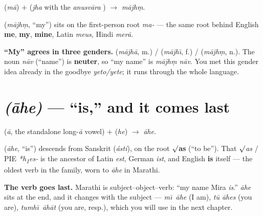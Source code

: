 \begin{sounds}
 (\emph{m\=a}) $+$  (\emph{jha} with the \emph{anusv\=ara} )
$\to$ \emph{m\=ajh\d{m}}.
\end{sounds}

\begin{cousinweb}
 (\emph{m\=ajh\d{m}}, ``my'') sits on the first-person root \emph{ma-}
--- the same root behind English \textbf{me}, \textbf{my}, \textbf{mine}, Latin
\emph{meus}, Hindi \emph{mer\=a}.
\end{cousinweb}

\begin{grammarlens}
\textbf{``My'' agrees in three genders.}  (\emph{m\=ajh\=a}, m.) /
 (\emph{m\=ajh\=\i}, f.) /  (\emph{m\=ajh\d{m}}, n.). The noun
\emph{n\=av} (``name'') is \textbf{neuter}, so ``my name'' is \emph{m\=ajh\d{m}
n\=av}. You met this gender idea already in the goodbye \emph{yeto/yete}; it runs
through the whole language.
\end{grammarlens}

\section{ \emph{(\=ahe)} --- ``is,'' and it comes last}
\label{lesson:aahe}

\begin{sounds}
 (\emph{\=a}, the standalone long-\emph{\=a} vowel) $+$  (\emph{he})
$\to$  \emph{\=ahe}.
\end{sounds}

\begin{cousinweb}
 (\emph{\=ahe}, ``is'') descends from Sanskrit  (\emph{ásti}),
on the root \textbf{$\surd$as} (``to be''). That \emph{$\surd$as} / PIE
\emph{*h\textsubscript{1}es-} is the ancestor of Latin \emph{est}, German
\emph{ist}, and English \textbf{is} itself --- the oldest verb in the family,
worn to \emph{\=ahe} in Marathi.
\end{cousinweb}

\begin{grammarlens}
\textbf{The verb goes last.} Marathi is subject--object--verb: ``my name Mira
\emph{is}.'' \emph{\=ahe} sits at the end, and it changes with the subject ---
\emph{m\=\i\ \=ahe} (I am), \emph{t\=u \=ahes} (you are), \emph{tumh\=\i\ \=ah\=at}
(you are, resp.), which you will use in the next chapter.
\end{grammarlens}

